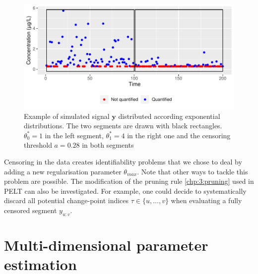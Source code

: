 \begin{figure}[ht]
    \centering
    \includegraphics{figs/Chap4/theta_max_ex.pdf}
    \caption{Example of simulated signal $\bm y$ distributed according exponential distributions. The two segments are drawn with black rectangles. $\theta^*_0 = 1$ in the left segment, $\theta^*_1 = 4$ in the right one and the censoring threshold $a = 0.28$ in both segments}
    \label{fig:theta_max}
\end{figure}

Censoring in the data creates identifiability problems that we chose to deal by adding a new regularisation parameter $\theta_{max}$. Note that other ways to tackle this problem are possible. The modification of the pruning rule \ref{chp:3:pruning} used in PELT can also be investigated. For example, one could decide to systematically discard all potential change-point indices $\tau \in \{u,\dots,v\}$ when evaluating a fully censored segment $y_{u:v}$.  

\section{Multi-dimensional parameter estimation}\label{chp:4:3}



